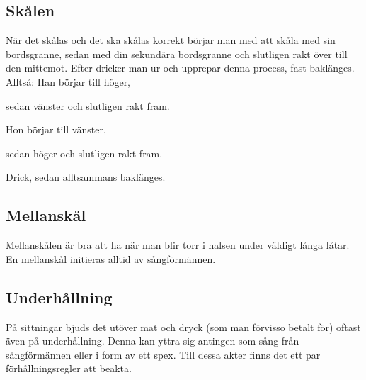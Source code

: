 \subsection*{Skålen}

När det skålas och det ska skålas korrekt börjar man 
med att skåla med sin bordsgranne, sedan med din sekundära 
bordsgranne och slutligen rakt över till den mittemot. 
Efter dricker man ur och upprepar denna process, fast baklänges.
\\

Alltså:
Han börjar till höger,

sedan vänster och slutligen rakt fram.

Hon börjar till vänster,

sedan höger och slutligen rakt fram.

Drick, sedan alltsammans baklänges.
\\

\subsection*{Mellanskål}


Mellanskålen är bra att ha när man blir torr i halsen under väldigt långa låtar. 
En mellanskål initieras alltid av sångförmännen.

\newpage

\subsection*{Underhållning}
På sittningar bjuds det utöver mat och dryck (som man förvisso betalt för) oftast även på underhållning.
Denna kan yttra sig antingen som sång från sångförmännen eller i form av ett spex.
Till dessa akter finns det ett par förhållningsregler att beakta.
\\

